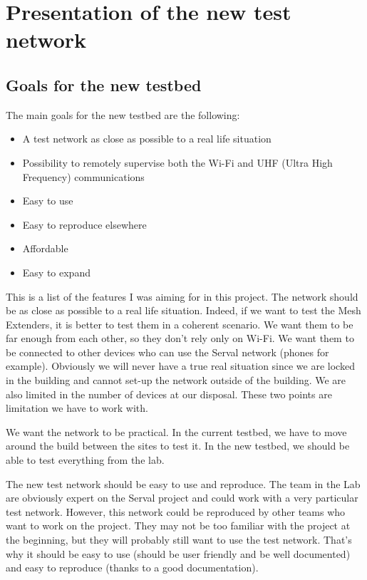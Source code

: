 \chapter{Presentation of the new test network}




\section{Goals for the new testbed}


The main goals for the new testbed are the following:
\begin{itemize}
	\item A test network as close as possible to a real life situation
	\item Possibility to remotely supervise both the Wi-Fi and UHF (Ultra High Frequency) communications
	\item Easy to use
	\item	Easy to reproduce elsewhere
	\item Affordable
	\item Easy to expand
\end{itemize}

This is a list of the features I was aiming for in this project. 
The network should be as close as possible to a real life situation. Indeed, if we want to test the Mesh Extenders, it is better to test them in a coherent scenario. We want them to be far enough from each other, so they don't rely only on Wi-Fi. We want them to be connected to other devices who can use the Serval network (phones for example). Obviously we will never have a true real situation since we are locked in the building and cannot set-up the network outside of the building. We are also limited in the number of devices at our disposal. These two points are limitation we have to work with.

We want the network to be practical. In the current testbed, we have to move around the build between the sites to test it. In the new testbed, we should be able to test everything from the lab.

The new test network should be easy to use and reproduce. The team in the Lab are obviously expert on the Serval project and could work with a very particular test network. However, this network could be reproduced by other teams who want to work on the project. They may not be too familiar with the project at the beginning, but they will probably still want to use the test network. That's why it should be easy to use (should be user friendly and be well documented) and easy to reproduce (thanks to a good documentation). 

